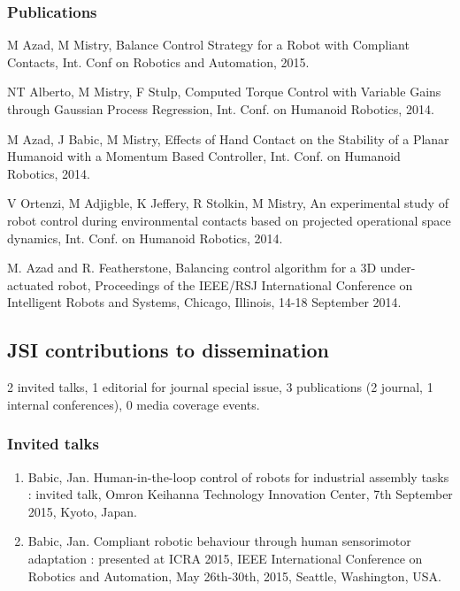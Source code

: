 \subsubsection{Publications}

M Azad, M Mistry, Balance Control Strategy for a Robot with Compliant Contacts, Int. Conf on Robotics and Automation, 2015.

NT Alberto, M Mistry, F Stulp, Computed Torque Control with Variable Gains through Gaussian Process Regression, Int. Conf. on Humanoid Robotics, 2014.

M Azad, J Babic, M Mistry, Effects of Hand Contact on the Stability of a Planar Humanoid with a Momentum Based Controller, Int. Conf. on Humanoid Robotics, 2014.

V Ortenzi, M Adjigble, K Jeffery, R Stolkin, M Mistry, An experimental study of robot control during environmental contacts based on projected operational space dynamics, Int. Conf. on Humanoid Robotics, 2014.

M. Azad and R. Featherstone, Balancing control algorithm for a 3D under-actuated robot, Proceedings of the IEEE/RSJ International Conference on Intelligent Robots and Systems, Chicago, Illinois, 14-18 September 2014.

\subsection{JSI contributions to dissemination}

2 invited talks, 1 editorial for journal special issue, 3 publications (2 journal, 1 internal conferences), 0 media coverage events.

\subsubsection{Invited talks}

\begin{enumerate}

\item Babic, Jan. Human-in-the-loop control of robots for industrial assembly tasks : invited talk, Omron Keihanna Technology Innovation Center, 7th September 2015, Kyoto, Japan.

\item Babic, Jan. Compliant robotic behaviour through human sensorimotor adaptation : presented at ICRA 2015, IEEE International Conference on Robotics and Automation, May 26th-30th, 2015, Seattle, Washington, USA.

\end{enumerate}

